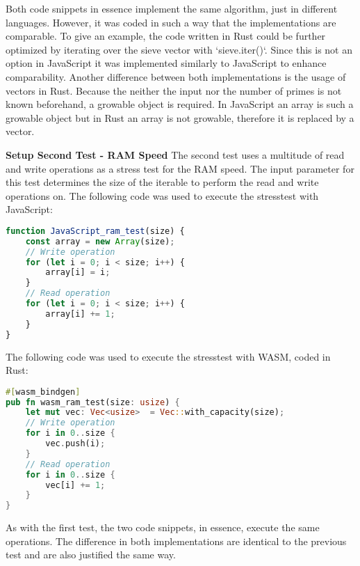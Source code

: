 Both code snippets in essence implement the same algorithm, just in different languages. However, it was coded in such a way that the implementations are comparable. To give an example, the code written in Rust could be further optimized by iterating over the sieve vector with `sieve.iter()`. Since this is not an option in JavaScript it was implemented similarly to JavaScript to enhance comparability. Another difference between both implementations is the usage of vectors in Rust. Because the neither the input nor the number of primes is not known beforehand, a growable object is required. In JavaScript an array is such a growable object but in Rust an array is not growable, therefore it is replaced by a vector. 

\textbf{Setup Second Test - RAM Speed} \newline
The second test uses a multitude of read and write operations as a stress test for the RAM speed. The input parameter for this test determines the size of the iterable to perform the read and write operations on.
\newpage
The following code was used to execute the stresstest with JavaScript:
\begin{lstlisting}[language=JavaScript, caption={RAM stresstest in JavaScript, source: self-coded}]
function JavaScript_ram_test(size) {
    const array = new Array(size);
    // Write operation
    for (let i = 0; i < size; i++) {
        array[i] = i;
    }
    // Read operation
    for (let i = 0; i < size; i++) {
        array[i] += 1;
    }
}
\end{lstlisting}

The following code was used to execute the stresstest with WASM, coded in Rust:
\begin{lstlisting}[language=Rust, caption={RAM stresstest in Rust, source: self-coded}]
#[wasm_bindgen]
pub fn wasm_ram_test(size: usize) {
    let mut vec: Vec<usize>  = Vec::with_capacity(size);
    // Write operation
    for i in 0..size {
        vec.push(i);
    }
    // Read operation
    for i in 0..size {
        vec[i] += 1;
    }
}
\end{lstlisting}

As with the first test, the two code snippets, in essence, execute the same operations. The difference in both implementations are identical to the previous test and are also justified the same way. 

